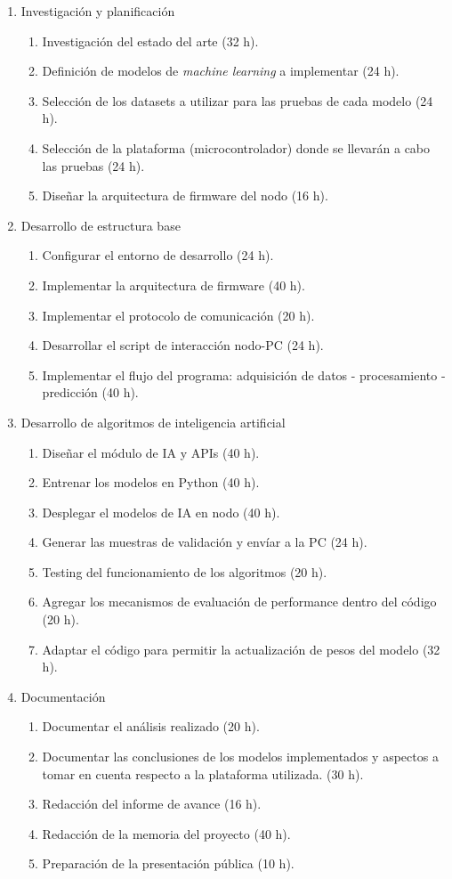 \documentclass[
11pt, %
codirector, %
]{charter}
\begin{document}
\begin{enumerate}
\item Investigación y planificación
	\begin{enumerate}
	\item Investigación del estado del arte (32 h).
	\item Definición de modelos de \textit{machine learning} a implementar (24 h).
	\item Selección de los datasets a utilizar para las pruebas de cada modelo (24 h).
	\item Selección de la plataforma (microcontrolador) donde se llevarán a cabo las pruebas (24 h).
	\item Diseñar la arquitectura de firmware del nodo (16 h).
	\end{enumerate}
\item Desarrollo de estructura base
	\begin{enumerate}
	\item Configurar el entorno de desarrollo (24 h).
	\item Implementar la arquitectura de firmware (40 h).
	\item Implementar el protocolo de comunicación (20 h).
	\item Desarrollar el script de interacción nodo-PC (24 h).
	\item Implementar el flujo del programa: adquisición de datos - procesamiento - predicción (40 h).
	\end{enumerate}
\item Desarrollo de algoritmos de inteligencia artificial
	\begin{enumerate}
	\item Diseñar el módulo de IA y APIs (40 h).
	\item Entrenar los modelos en Python (40 h).
	\item Desplegar el modelos de IA en nodo (40 h).
	\item Generar las muestras de validación y envíar a la PC (24 h).
	\item Testing del funcionamiento de los algoritmos (20 h). 
	\item Agregar los mecanismos de evaluación de performance dentro del código (20 h).
	\item Adaptar el código para permitir la actualización de pesos del modelo (32 h). 
	\end{enumerate}
\item Documentación
	\begin{enumerate}
	\item Documentar el análisis realizado (20 h).
	\item Documentar las conclusiones de los modelos implementados y aspectos a tomar en cuenta respecto a la plataforma utilizada. (30 h).
	\item Redacción del informe de avance (16 h).
	\item Redacción de la memoria del proyecto (40 h).
	\item Preparación de la presentación pública (10 h).
	\end{enumerate}
\end{enumerate}
\end{document}

